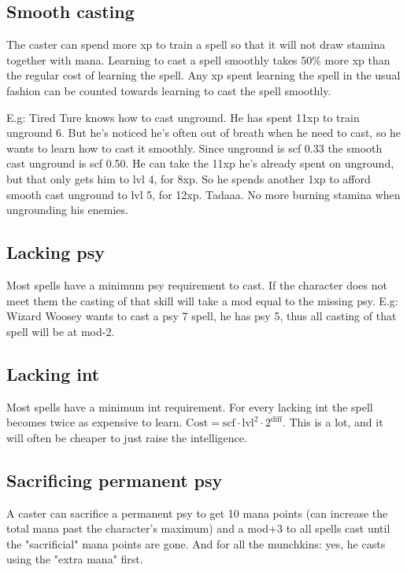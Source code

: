 \subsection*{Smooth casting}
The caster can spend more xp to train a spell so that it will not draw stamina together with mana. Learning to cast a spell smoothly takes 50\% more xp than the regular cost of learning the spell. Any xp spent learning the spell in the usual fashion can be counted towards learning to cast the spell smoothly.

E.g: Tired Ture knows how to cast unground. He has spent 11xp to train unground 6. But he's noticed he's often out of breath when he need to cast, so he wants to learn how to cast it smoothly. Since unground is scf 0.33 the smooth cast unground is scf 0.50. He can take the 11xp he's already spent on unground, but that only gets him to lvl 4, for 8xp. So he spends another 1xp to afford smooth cast unground to lvl 5, for 12xp. Tadaaa. No more burning stamina when ungrounding his enemies.


\subsection*{Lacking psy}
Most spells have a minimum psy requirement to cast. If the character does not meet them the casting of that skill will take a mod equal to the missing psy.
E.g: Wizard Woosey wants to cast a psy 7 spell, he has psy 5, thus all casting of that spell will be at mod-2.


\subsection*{Lacking int}
Most spells have a minimum int requirement. For every lacking int the spell becomes twice as expensive to learn. $\mathrm{Cost} = \mathrm{scf} \cdot \mathrm{lvl}^2 \cdot 2^{\mathrm{diff}}$. This is a lot, and it will often be cheaper to just raise the intelligence.


\subsection*{Sacrificing permanent psy}
A caster can sacrifice a permanent psy to get 10 mana points (can increase the total mana past the character's maximum) and a mod+3 to all spells cast until the "sacrificial" mana points are gone. And for all the munchkins: yes, he casts using the "extra mana" first.


